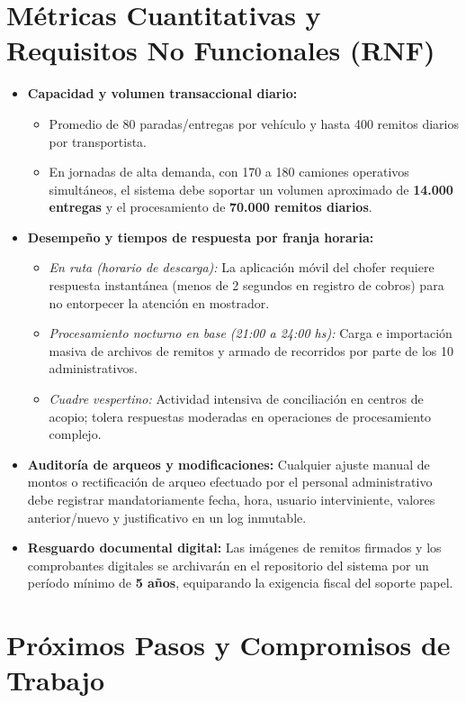 \documentclass[11pt,a4paper]{article}
\begin{document}
\section{Métricas Cuantitativas y Requisitos No Funcionales (RNF)}

\begin{itemize}
  \item \textbf{Capacidad y volumen transaccional diario:}
  \begin{itemize}
    \item Promedio de 80 paradas/entregas por vehículo y hasta 400 remitos diarios por transportista.
    \item En jornadas de alta demanda, con 170 a 180 camiones operativos simultáneos, el sistema debe soportar un volumen aproximado de \textbf{14.000 entregas} y el procesamiento de \textbf{70.000 remitos diarios}.
  \end{itemize}
  \item \textbf{Desempeño y tiempos de respuesta por franja horaria:}
  \begin{itemize}
    \item \textit{En ruta (horario de descarga):} La aplicación móvil del chofer requiere respuesta instantánea (menos de 2 segundos en registro de cobros) para no entorpecer la atención en mostrador.
    \item \textit{Procesamiento nocturno en base (21:00 a 24:00 hs):} Carga e importación masiva de archivos de remitos y armado de recorridos por parte de los 10 administrativos.
    \item \textit{Cuadre vespertino:} Actividad intensiva de conciliación en centros de acopio; tolera respuestas moderadas en operaciones de procesamiento complejo.
  \end{itemize}
  \item \textbf{Auditoría de arqueos y modificaciones:} Cualquier ajuste manual de montos o rectificación de arqueo efectuado por el personal administrativo debe registrar mandatoriamente fecha, hora, usuario interviniente, valores anterior/nuevo y justificativo en un log inmutable.
  \item \textbf{Resguardo documental digital:} Las imágenes de remitos firmados y los comprobantes digitales se archivarán en el repositorio del sistema por un período mínimo de \textbf{5 años}, equiparando la exigencia fiscal del soporte papel.
\end{itemize}

\section{Próximos Pasos y Compromisos de Trabajo}
\end{document}
